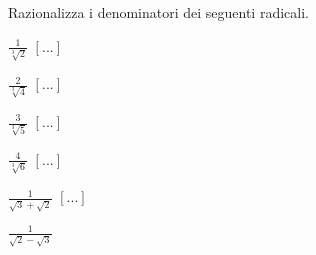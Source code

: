 \begin{esercizio}
\label{ese:2.72}
Razionalizza i denominatori dei seguenti radicali.
\begin{htmulticols}{4}
\begin{enumeratea}
\item \(\frac 1{\sqrt[3]2}\)
\hfill \(\left[...\right]\)
\item \(\frac 2{\sqrt[3]4}\)
\hfill \(\left[...\right]\)
\item \(\frac 3{\sqrt[3]5}\)
\hfill \(\left[...\right]\)
\item \(\frac 4{\sqrt[3]6}\)
\hfill \(\left[...\right]\)
\item \(\frac 1{\sqrt 3+\sqrt 2}\)
\hfill \(\left[...\right]\)
\item \(\frac 1{\sqrt 2-\sqrt 3}\)

\end{enumeratea}
\end{htmulticols}
\end{esercizio}
